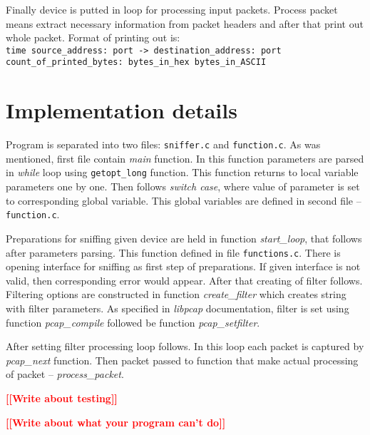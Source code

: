 \documentclass[12pt,a4paper]{article}
\begin{document}
Finally device is putted in loop for processing input packets. Process packet 
means extract necessary information from packet headers and after that print out 
whole packet. Format of printing out is: \\
\texttt{time source\_address: port -> destination\_address: port\\
count\_of\_printed\_bytes: bytes\_in\_hex bytes\_in\_ASCII
}

\section{Implementation details}

Program is separated into two files: \texttt{sniffer.c} and \texttt{function.c}. 
As was mentioned, first file contain \textit{main} function. In this function 
parameters are parsed in \textit{while} loop using \texttt{getopt\_long} function. 
This function returns to local variable parameters one by one. Then follows  
\textit{switch case}, where value of parameter is set to corresponding global 
variable. This global variables are defined in second file -- \texttt{function.c}. 

Preparations for sniffing given device are held in function \textit{start\_loop}, 
that follows after parameters parsing. This function defined in file 
\texttt{functions.c}. There is opening interface for sniffing as first step of 
preparations. If given interface is not valid, then corresponding error would 
appear. After that creating of filter follows. Filtering options are constructed 
in function \textit{create\_filter} which creates string with filter parameters. 
As specified in \textit{libpcap} documentation, filter is set using function 
\textit{pcap\_compile} followed be function \textit{pcap\_setfilter}. 

After setting filter processing loop follows. In this loop each packet is 
captured by \textit{pcap\_next} function. Then packet passed to function that 
make actual processing of packet -- \textit{process\_packet}. 

\textcolor{red}{\textbf{[[Write about testing]]}}

\textcolor{red}{\textbf{[[Write about what your program can't do]]}}
\end{document}

